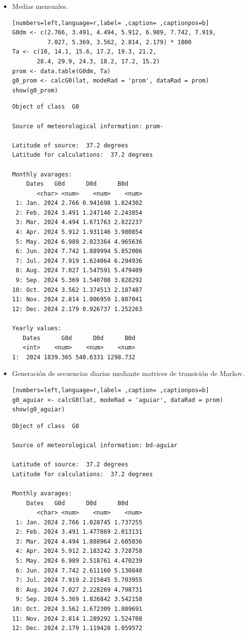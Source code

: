 \begin{itemize}
\item Medias mensuales.
\begin{lstlisting}[numbers=left,language=r,label= ,caption= ,captionpos=b]
G0dm <- c(2.766, 3.491, 4.494, 5.912, 6.989, 7.742, 7.919,
          7.027, 5.369, 3.562, 2.814, 2.179) * 1000
Ta <- c(10, 14.1, 15.6, 17.2, 19.3, 21.2,
       28.4, 29.9, 24.3, 18.2, 17.2, 15.2)
prom <- data.table(G0dm, Ta) 
g0_prom <- calcG0(lat, modeRad = 'prom', dataRad = prom)
show(g0_prom)
\end{lstlisting}

\begin{verbatim}
Object of class  G0 

Source of meteorological information: prom- 

Latitude of source:  37.2 degrees
Latitude for calculations:  37.2 degrees

Monthly avarages:
	Dates   G0d      D0d      B0d
       <char> <num>    <num>    <num>
 1: Jan. 2024 2.766 0.941698 1.824302
 2: Feb. 2024 3.491 1.247146 2.243854
 3: Mar. 2024 4.494 1.671763 2.822237
 4: Apr. 2024 5.912 1.931146 3.980854
 5: May. 2024 6.989 2.023364 4.965636
 6: Jun. 2024 7.742 1.889994 5.852006
 7: Jul. 2024 7.919 1.624064 6.294936
 8: Aug. 2024 7.027 1.547591 5.479409
 9: Sep. 2024 5.369 1.540708 3.828292
10: Oct. 2024 3.562 1.374513 2.187487
11: Nov. 2024 2.814 1.006959 1.807041
12: Dec. 2024 2.179 0.926737 1.252263

Yearly values:
   Dates      G0d      D0d      B0d
   <int>    <num>    <num>    <num>
1:  2024 1839.365 540.6331 1298.732
\end{verbatim}

\item Generación de secuencias diarias mediante matrices de transición de Markov.
\begin{lstlisting}[numbers=left,language=r,label= ,caption= ,captionpos=b]
g0_aguiar <- calcG0(lat, modeRad = 'aguiar', dataRad = prom)
show(g0_aguiar)
\end{lstlisting}

\begin{verbatim}
Object of class  G0 

Source of meteorological information: bd-aguiar 

Latitude of source:  37.2 degrees
Latitude for calculations:  37.2 degrees

Monthly avarages:
	Dates   G0d      D0d      B0d
       <char> <num>    <num>    <num>
 1: Jan. 2024 2.766 1.028745 1.737255
 2: Feb. 2024 3.491 1.477869 2.013131
 3: Mar. 2024 4.494 1.888964 2.605036
 4: Apr. 2024 5.912 2.183242 3.728758
 5: May. 2024 6.989 2.518761 4.470239
 6: Jun. 2024 7.742 2.611160 5.130840
 7: Jul. 2024 7.919 2.215045 5.703955
 8: Aug. 2024 7.027 2.228269 4.798731
 9: Sep. 2024 5.369 1.826842 3.542158
10: Oct. 2024 3.562 1.672309 1.889691
11: Nov. 2024 2.814 1.289292 1.524708
12: Dec. 2024 2.179 1.119428 1.059572


\end{verbatim}
\end{itemize}
